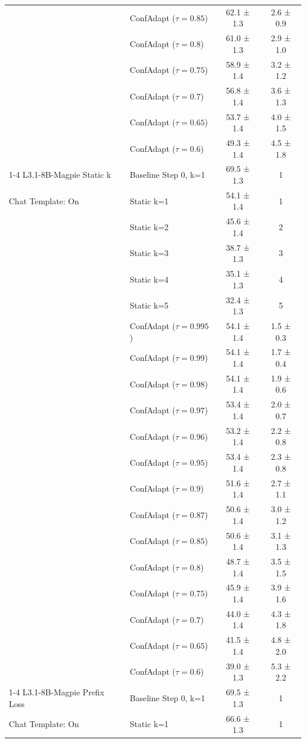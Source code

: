 \documentclass{article}
\theoremstyle{plain}
\theoremstyle{definition}
\theoremstyle{remark}
\begin{document}
\begin{table}[h!]
\begin{tabular}{llcc}
 & ConfAdapt ($\tau=0.85$) & 62.1 ± 1.3 & 2.6 ± 0.9 \\
 & ConfAdapt ($\tau=0.8$) & 61.0 ± 1.3 & 2.9 ± 1.0 \\
 & ConfAdapt ($\tau=0.75$) & 58.9 ± 1.4 & 3.2 ± 1.2 \\
 & ConfAdapt ($\tau=0.7$) & 56.8 ± 1.4 & 3.6 ± 1.3 \\
 & ConfAdapt ($\tau=0.65$) & 53.7 ± 1.4 & 4.0 ± 1.5 \\
 & ConfAdapt ($\tau=0.6$) & 49.3 ± 1.4 & 4.5 ± 1.8 \\
\cline{1-4}
L3.1-8B-Magpie Static k & Baseline Step 0, k=1 & 69.5 ± 1.3 & 1 \\
 Chat Template: On & Static k=1 & 54.1 ± 1.4 & 1 \\
 & Static k=2 & 45.6 ± 1.4 & 2 \\
 & Static k=3 & 38.7 ± 1.3 & 3 \\
 & Static k=4 & 35.1 ± 1.3 & 4 \\
 & Static k=5 & 32.4 ± 1.3 & 5 \\
 & ConfAdapt ($\tau=0.995$) & 54.1 ± 1.4 & 1.5 ± 0.3 \\
 & ConfAdapt ($\tau=0.99$) & 54.1 ± 1.4 & 1.7 ± 0.4 \\
 & ConfAdapt ($\tau=0.98$) & 54.1 ± 1.4 & 1.9 ± 0.6 \\
 & ConfAdapt ($\tau=0.97$) & 53.4 ± 1.4 & 2.0 ± 0.7 \\
 & ConfAdapt ($\tau=0.96$) & 53.2 ± 1.4 & 2.2 ± 0.8 \\
 & ConfAdapt ($\tau=0.95$) & 53.4 ± 1.4 & 2.3 ± 0.8 \\
 & ConfAdapt ($\tau=0.9$) & 51.6 ± 1.4 & 2.7 ± 1.1 \\
 & ConfAdapt ($\tau=0.87$) & 50.6 ± 1.4 & 3.0 ± 1.2 \\
 & ConfAdapt ($\tau=0.85$) & 50.6 ± 1.4 & 3.1 ± 1.3 \\
 & ConfAdapt ($\tau=0.8$) & 48.7 ± 1.4 & 3.5 ± 1.5 \\
 & ConfAdapt ($\tau=0.75$) & 45.9 ± 1.4 & 3.9 ± 1.6 \\
 & ConfAdapt ($\tau=0.7$) & 44.0 ± 1.4 & 4.3 ± 1.8 \\
 & ConfAdapt ($\tau=0.65$) & 41.5 ± 1.4 & 4.8 ± 2.0 \\
 & ConfAdapt ($\tau=0.6$) & 39.0 ± 1.3 & 5.3 ± 2.2 \\
\cline{1-4}
L3.1-8B-Magpie Prefix Loss & Baseline Step 0, k=1 & 69.5 ± 1.3 & 1 \\
 Chat Template: On & Static k=1 & 66.6 ± 1.3 & 1 \\

\end{tabular}
\end{table}
\end{document}
